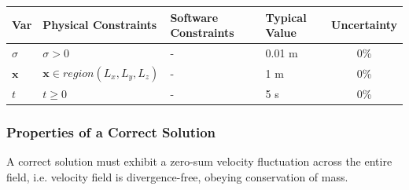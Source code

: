 \documentclass[12pt]{article}
\begin{document}

\begin{table}[!h]
  \caption{Input Variables} \label{TblInputVar}
  \renewcommand{\arraystretch}{1.2}
\noindent \begin{longtable*}{l l l l c} 
  \toprule
  \textbf{Var} & \textbf{Physical Constraints} & \textbf{Software Constraints} &
                             \textbf{Typical Value} & \textbf{Uncertainty}\\
  \midrule 
    $\sigma$ & $\sigma > 0$ & - & 0.01 \si[per-mode=symbol] {\metre} & 0\%
  \\
    $\textbf{x}$ & $\textbf{x} \in region(L_x,L_y,L_z)$ & - & 1 \si[per-mode=symbol] {\metre} & 0\%
  \\
    $t$ & $t \geq 0$ & - & 5 \si[per-mode=symbol] {\second} & 0\%
  \\
  \bottomrule
\end{longtable*}
\end{table}

\noindent 


\subsubsection{Properties of a Correct Solution} \label{sec_CorrectSolution}

\noindent
A correct solution must exhibit a zero-sum velocity fluctuation across the entire field, i.e. velocity field is divergence-free, obeying conservation of mass.
\end{document}
